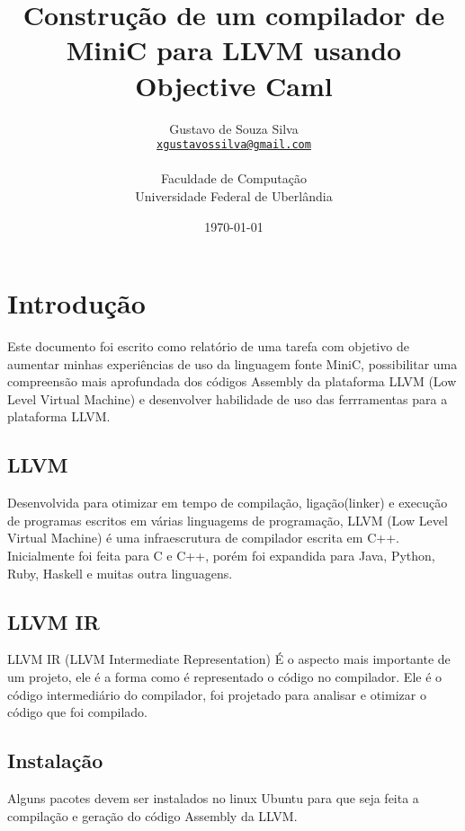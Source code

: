 \documentclass[12pt,a4paper,twoside]{report}
\title{Construção de um compilador de MiniC para LLVM usando Objective Caml}
\date{}
\author{Gustavo de Souza Silva \\
\texttt{\small \url{xgustavossilva@gmail.com}}\\
\vspace{1cm} \\
Faculdade de Computação \\
Universidade Federal de Uberlândia
}
\date{\today}
\begin{document}
  \maketitle
\lstlistoflistings

\tableofcontents    


\fancyhead[RE,LO]{\thesection}

\setlength{\parskip}{0.15in} %

\chapter{Introdução}
Este documento foi escrito como relatório de uma tarefa com objetivo de aumentar minhas experiências de uso da linguagem fonte MiniC, possibilitar uma compreensão mais aprofundada dos códigos Assembly da plataforma LLVM (Low Level Virtual Machine) e desenvolver habilidade de uso das ferrramentas para a plataforma LLVM.

\section{LLVM}
Desenvolvida para otimizar em tempo de compilação, ligação(linker) e execução de programas escritos em várias linguagems de programação, LLVM (Low Level Virtual Machine) é uma infraescrutura de compilador escrita em C++. Inicialmente foi feita para C e C++, porém foi expandida para Java, Python, Ruby, Haskell e muitas outra linguagens.

\section{LLVM IR}
LLVM IR (LLVM Intermediate Representation) É o aspecto mais importante de um projeto, ele é a forma como é representado o código no compilador. Ele é o código intermediário do compilador, foi projetado para analisar e otimizar o código que foi compilado.

\section{Instalação}
Alguns pacotes devem ser instalados no linux Ubuntu para que seja feita a compilação e geração do código Assembly da LLVM.
\end{document}
